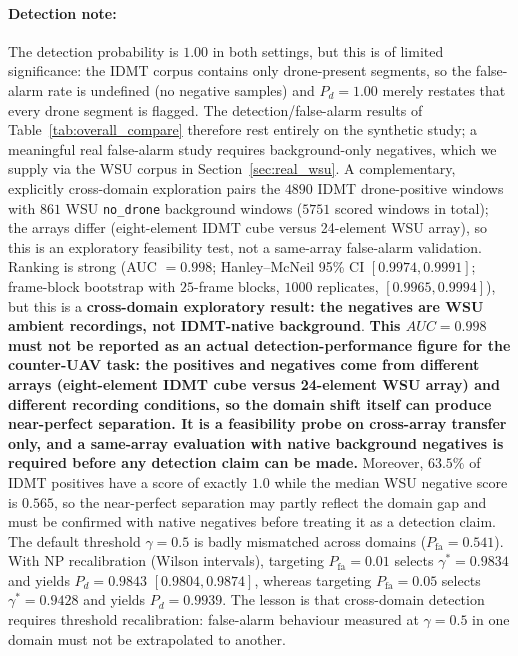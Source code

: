 \documentclass[sensors,article,submit,pdftex,moreauthors]{Definitions/mdpi}
\begin{document}
\paragraph{Detection note:}
The detection probability is $1.00$ in both settings, but this is of limited significance: the IDMT corpus contains only drone-present segments, so the false-alarm rate is undefined (no negative samples) and $P_d=1.00$ merely restates that every drone segment is flagged. The detection/false-alarm results of Table~\ref{tab:overall_compare} therefore rest entirely on the synthetic study; a meaningful real false-alarm study requires background-only negatives, which we supply via the WSU corpus in Section~\ref{sec:real_wsu}. A complementary, explicitly cross-domain exploration pairs the $4890$ IDMT drone-positive windows with $861$ WSU \texttt{no\_drone} background windows ($5751$ scored windows in total); the arrays differ (eight-element IDMT cube versus 24-element WSU array), so this is an exploratory feasibility test, not a same-array false-alarm validation. Ranking is strong (AUC $=0.998$; Hanley--McNeil 95\% CI $[0.9974, 0.9991]$; frame-block bootstrap with $25$-frame blocks, $1000$ replicates, $[0.9965, 0.9994]$), but this is a \textbf{cross-domain exploratory result: the negatives are WSU ambient recordings, not IDMT-native background}. \textbf{This $AUC=0.998$ must not be reported as an actual detection-performance figure for the counter-UAV task: the positives and negatives come from different arrays (eight-element IDMT cube versus 24-element WSU array) and different recording conditions, so the domain shift itself can produce near-perfect separation. It is a feasibility probe on cross-array transfer only, and a same-array evaluation with native background negatives is required before any detection claim can be made.} Moreover, $63.5\%$ of IDMT positives have a score of exactly $1.0$ while the median WSU negative score is $0.565$, so the near-perfect separation may partly reflect the domain gap and must be confirmed with native negatives before treating it as a detection claim. The default threshold $\gamma=0.5$ is badly mismatched across domains ($P_{\mathrm{fa}}=0.541$). With NP recalibration (Wilson intervals), targeting $P_{\mathrm{fa}}=0.01$ selects $\gamma^*=0.9834$ and yields $P_d=0.9843$ $[0.9804,0.9874]$, whereas targeting $P_{\mathrm{fa}}=0.05$ selects $\gamma^*=0.9428$ and yields $P_d=0.9939$. The lesson is that cross-domain detection requires threshold recalibration: false-alarm behaviour measured at $\gamma=0.5$ in one domain must not be extrapolated to another.
\end{document}
